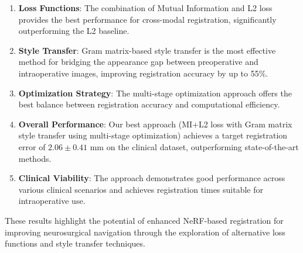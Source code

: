 \begin{enumerate}
    \item \textbf{Loss Functions}: The combination of Mutual Information and L2 loss provides the best performance for cross-modal registration, significantly outperforming the L2 baseline.
    
    \item \textbf{Style Transfer}: Gram matrix-based style transfer is the most effective method for bridging the appearance gap between preoperative and intraoperative images, improving registration accuracy by up to 55\%.
    
    \item \textbf{Optimization Strategy}: The multi-stage optimization approach offers the best balance between registration accuracy and computational efficiency.
    
    \item \textbf{Overall Performance}: Our best approach (MI+L2 loss with Gram matrix style transfer using multi-stage optimization) achieves a target registration error of $2.06 \pm 0.41$ mm on the clinical dataset, outperforming state-of-the-art methods.
    
    \item \textbf{Clinical Viability}: The approach demonstrates good performance across various clinical scenarios and achieves registration times suitable for intraoperative use.
\end{enumerate}

These results highlight the potential of enhanced NeRF-based registration for improving neurosurgical navigation through the exploration of alternative loss functions and style transfer techniques. 